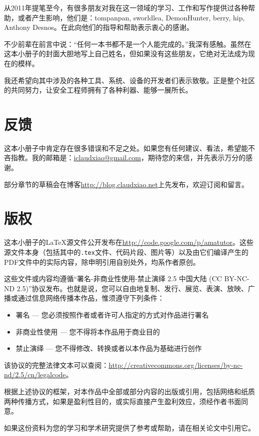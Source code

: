 从2011年提笔至今，有很多朋友对我在这一领域的学习、工作和写作提供过各种帮助，或者产生影响，他们是：tompanpan, sworldlea, DemonHunter, berry, hip, Anthony Desnos。在此向他们的指导和帮助表示衷心的感谢。

不少前辈在前言中说：“任何一本书都不是一个人能完成的。”我深有感触。虽然在这本小册子的封面大胆地写上自己姓名，但如果没有这些朋友，它绝对无法成为现在的模样。

我还希望向其中涉及的各种工具、系统、设备的开发者们表示致敬。正是整个社区的共同努力，让安全工程师拥有了各种利器、能够一展所长。

\section*{反馈}
这本小册子中肯定存在很多错误和不足之处。如果您有任何建议、看法，希望能不吝指教。我的邮箱是：\href{mailto:iclaudxiao@gmail.com}{iclaudxiao@gmail.com}，期待您的来信，并先表示万分的感谢。

部分章节的草稿会在博客\url{http://blog.claudxiao.net}上先发布，欢迎订阅和留言。

\section*{版权}
这本小册子的{\LaTeX}源文件公开发布在\url{http://code.google.com/p/amatutor}。这些源文件本身（包括其中的\lstinline!.tex!文件、代码片段、图片等）以及由它们编译产生的PDF文件中的实际内容，除申明引用自别处外，均系作者原创。

这些文件或内容均遵循“署名-非商业性使用-禁止演绎 2.5 中国大陆 (CC BY-NC-ND 2.5)”协议发布。也就是说，您可以自由地复制、发行、展览、表演、放映、广播或通过信息网络传播本作品，惟须遵守下列条件：

\begin{itemize}
  \item 署名 — 您必须按照作者或者许可人指定的方式对作品进行署名
  \item 非商业性使用 — 您不得将本作品用于商业目的
  \item 禁止演绎 — 您不得修改、转换或者以本作品为基础进行创作
\end{itemize}

该协议的完整法律文本可以查阅：\url{http://creativecommons.org/licenses/by-nc-nd/2.5/cn/legalcode}。

根据上述协议的框架，对本作品中全部或部分内容的出版或引用，包括网络和纸质两种传播方式，如果是盈利性目的，或实际直接产生盈利效应，须经作者书面同意。

如果这份资料为您的学习和学术研究提供了参考或帮助，请在相关论文中引用它。

